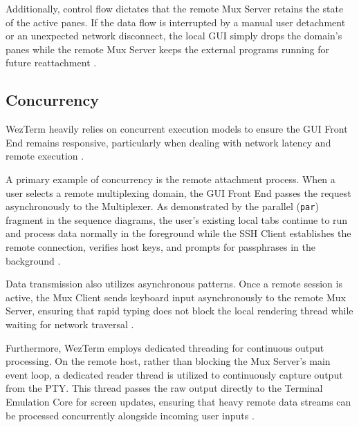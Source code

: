 Additionally, control flow dictates that the remote Mux Server retains the state of the active panes. If the data flow is interrupted by a manual user detachment or an unexpected network disconnect, the local GUI simply drops the domain's panes while the remote Mux Server keeps the external programs running for future reattachment \cite{multiplexing,sshdomain}.

\subsection{Concurrency}
\label{sec:concurrency}

WezTerm heavily relies on concurrent execution models to ensure the GUI Front End remains responsive, particularly when dealing with network latency and remote execution \cite{client-source,term-crate}.

A primary example of concurrency is the remote attachment process. When a user selects a remote multiplexing domain, the GUI Front End passes the request asynchronously to the Multiplexer. As demonstrated by the parallel (\texttt{par}) fragment in the sequence diagrams, the user's existing local tabs continue to run and process data normally in the foreground while the SSH Client establishes the remote connection, verifies host keys, and prompts for passphrases in the background \cite{ssh,sshdomain,client-source}.

Data transmission also utilizes asynchronous patterns. Once a remote session is active, the Mux Client sends keyboard input asynchronously to the remote Mux Server, ensuring that rapid typing does not block the local rendering thread while waiting for network traversal \cite{client-source}.

Furthermore, WezTerm employs dedicated threading for continuous output processing. On the remote host, rather than blocking the Mux Server's main event loop, a dedicated reader thread is utilized to continuously capture output from the PTY. This thread passes the raw output directly to the Terminal Emulation Core for screen updates, ensuring that heavy remote data streams can be processed concurrently alongside incoming user inputs \cite{term-crate}.